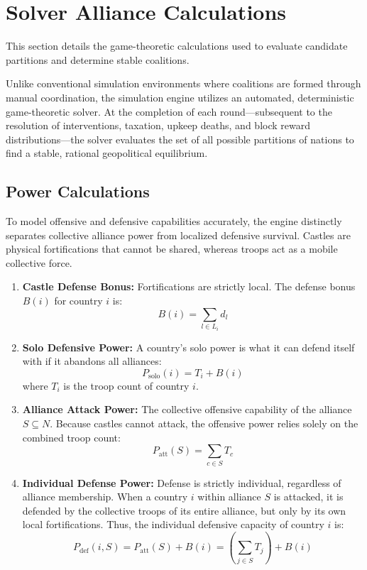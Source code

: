 \section{Solver Alliance Calculations}
This section details the game-theoretic calculations used to evaluate candidate partitions and determine stable coalitions.

Unlike conventional simulation environments where coalitions are formed through manual coordination, the simulation engine utilizes an automated, deterministic game-theoretic solver. At the completion of each round—subsequent to the resolution of interventions, taxation, upkeep deaths, and block reward distributions—the solver evaluates the set of all possible partitions of nations to find a stable, rational geopolitical equilibrium.

\subsection{Power Calculations}
To model offensive and defensive capabilities accurately, the engine distinctly separates collective alliance power from localized defensive survival. Castles are physical fortifications that cannot be shared, whereas troops act as a mobile collective force.

\begin{enumerate}
    \item \textbf{Castle Defense Bonus:} Fortifications are strictly local. The defense bonus $B(i)$ for country $i$ is:
    \begin{equation}
    B(i) = \sum_{l \in L_i} d_l
    \end{equation}

    \item \textbf{Solo Defensive Power:} A country's solo power is what it can defend itself with if it abandons all alliances:
    \begin{equation}
    P_{\text{solo}}(i) = T_i + B(i)
    \end{equation}
    where $T_i$ is the troop count of country $i$.
    
    \item \textbf{Alliance Attack Power:} The collective offensive capability of the alliance $S \subseteq N$. Because castles cannot attack, the offensive power relies solely on the combined troop count:
    \begin{equation}
    P_{\text{att}}(S) = \sum_{c \in S} T_c
    \end{equation}
    
    \item \textbf{Individual Defense Power:} Defense is strictly individual, regardless of alliance membership. When a country $i$ within alliance $S$ is attacked, it is defended by the collective troops of its entire alliance, but only by its own local fortifications. Thus, the individual defensive capacity of country $i$ is:
    \begin{equation}
    P_{\text{def}}(i, S) = P_{\text{att}}(S) + B(i) = \left( \sum_{j \in S} T_j \right) + B(i)
    \end{equation}
\end{enumerate}

